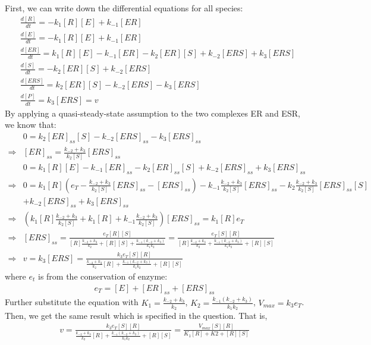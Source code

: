 \documentclass[paper=a4, fontsize=11pt]{scrartcl} %
\numberwithin{equation}{section} %
\numberwithin{figure}{section} %
\numberwithin{table}{section} %
\begin{document}
\begin{enumerate}[a)]
		First, we can write down the differential equations for all species:
		\begin{align*}
			&\frac{d[R]}{dt}=-k_1[R][E]+k_{-1}[ER]\\
			&\frac{d[E]}{dt}=-k_1[R][E]+k_{-1}[ER]\\
			&\frac{d[ER]}{dt}=k_1[R][E]-k_{-1}[ER]-k_2[ER][S]+k_{-2}[ERS]+k_3[ERS]\\
			&\frac{d[S]}{dt}=-k_2[ER][S]+k_{-2}[ERS]\\
			&\frac{d[ERS]}{dt}=k_2[ER][S]-k_{-2}[ERS]-k_3[ERS]\\
			&\frac{d[P]}{dt}=k_3[ERS]=v
		\end{align*}
		By applying a quasi-steady-state assumption to the two complexes ER and ESR, we know that:
		\begin{align*}
			&0=k_2[ER]_{ss}[S]-k_{-2}[ERS]_{ss}-k_3[ERS]_{ss}\\
			\Rightarrow &[ER]_{ss}=\frac{k_{-2}+k_3}{k_2[S]}[ERS]_{ss}\\
			&0=k_1[R][E]-k_{-1}[ER]_{ss}-k_2[ER]_{ss}[S]+k_{-2}[ERS]_{ss}+k_3[ERS]_{ss}\\
			\Rightarrow&0=k_1[R](e_T-\frac{k_{-2}+k_3}{k_2[S]}[ERS]_{ss}-[ERS]_{ss})-k_{-1}\frac{k_{-2}+k_3}{k_2[S]}[ERS]_{ss}-k_2\frac{k_{-2}+k_3}{k_2[S]}[ERS]_{ss}[S]\\
			&+k_{-2}[ERS]_{ss}+k_3[ERS]_{ss}\\
			\Rightarrow& (k_1[R]\frac{k_{-2}+k_3}{k_2[S]}+k_1[R]+k_{-1}\frac{k_{-2}+k_3}{k_2[S]})[ERS]_{ss}=k_1[R]e_T\\
			\Rightarrow& [ERS]_{ss}= \frac{e_T[R][S]}{[R]\frac{k_{-2}+k_3}{k_2}+[R][S]+\frac{k_{-1}(k_{-2}+k_3)}{k_1k_2}} = \frac{e_T[S][R]}{[R]\frac{k_{-2}+k_3}{k_2}+\frac{k_{-1}(k_{-2}+k_3)}{k_1k_2}+[R][S]}\\
			\Rightarrow& v=k_3[ERS]=\frac{k_3e_T[S][R]}{\frac{k_{-2}+k_3}{k_2}[R]+\frac{k_{-1}(k_{-2}+k_3)}{k_1k_2}+[R][S]}
		\end{align*}
		where $e_t$ is from the conservation of enzyme:
		\begin{align*}
			e_T=[E]+[ER]_{ss}+[ERS]_{ss}
		\end{align*}
		Further substitute the equation with $K_1=\frac{k_{-2}+k_3}{k_2}$, $K_2=\frac{k_{-1}(k_{-2}+k_3)}{k_1k_2}$, $V_{max}=k_3e_T$. Then, we get the same result which is specified in the question. That is,
		\begin{align*}
			v=\frac{k_3e_T[S][R]}{\frac{k_{-2}+k_3}{k_2}[R]+\frac{k_{-1}(k_{-2}+k_3)}{k_1k_2}+[R][S]}=\frac{V_{max}[S][R]}{K_1[R]+K2+[R][S]}
		\end{align*}


\end{enumerate}
\end{document}
